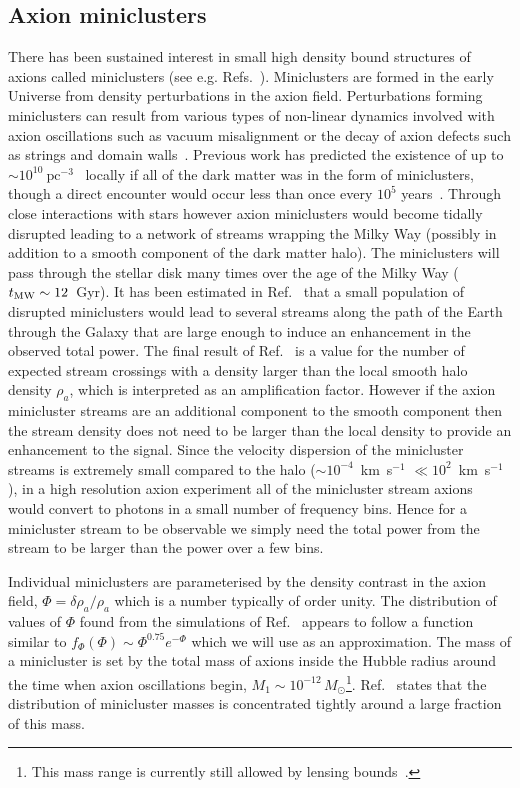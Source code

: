 \subsection{Axion miniclusters}\label{sec:axions_miniclusters}
There has been sustained interest in small high density bound structures of axions called miniclusters (see e.g. Refs.~\cite{Hogan:1988mp,Kolb:1993zz,Kolb:1993hw,Kolb:1994fi,Kolb:1995bu,Berezinsky:2013fxa,Tinyakov:2015cgg,Fairbairn:2017dmf}). Miniclusters are formed in the early Universe from density perturbations in the axion field. Perturbations forming miniclusters can result from various types of non-linear dynamics involved with axion oscillations such as vacuum misalignment or the decay of axion defects such as strings and domain walls~\cite{Chang:1998tb}. Previous work has predicted the existence of up to $\sim 10^{10}~\textrm{pc}^{-3}$~\cite{Tinyakov:2015cgg} locally if all of the dark matter was in the form of miniclusters, though a direct encounter would occur less than once every $10^5$ years~\cite{Kolb:1994fi}. Through close interactions with stars however axion miniclusters would become tidally disrupted leading to a network of streams wrapping the Milky Way (possibly in addition to a smooth component of the dark matter halo). The miniclusters will pass through the stellar disk many times over the age of the Milky Way ($t_{\rm MW} \sim 12$~Gyr). It has been estimated in Ref.~\cite{Tinyakov:2015cgg} that a small population of disrupted miniclusters would lead to several streams along the path of the Earth through the Galaxy that are large enough to induce an enhancement in the observed total power. The final result of Ref.~\cite{Tinyakov:2015cgg} is a value for the number of expected stream crossings with a density larger than the local smooth halo density $\rho_a$, which is interpreted as an amplification factor. However if the axion minicluster streams are an additional component to the smooth component then the stream density does not need to be larger than the local density to provide an enhancement to the signal. Since the velocity dispersion of the minicluster streams is extremely small compared to the halo ($\sim10^{-4}$~km~s$^{-1}$ $\ll 10^{2}$~km~s$^{-1}$), in a high resolution axion experiment all of the minicluster stream axions would convert to photons in a small number of frequency bins. Hence for a minicluster stream to be observable we simply need the total power from the stream to be larger than the power over a few bins.

Individual miniclusters are parameterised by the density contrast in the axion field, $\Phi = \delta \rho_a / \rho_a$ which is a number typically of order unity. The distribution of values of $\Phi$ found from the simulations of Ref.~\cite{Kolb:1995bu} appears to follow a function similar to $f_\Phi(\Phi) \sim \Phi^{0.75} e^{-\Phi}$ which we will use as an approximation. The mass of a minicluster is set by the total mass of axions inside the Hubble radius around the time when axion oscillations begin, $M_1 \sim 10^{-12}\, M_\odot$\footnote{This mass range is currently still allowed by lensing bounds~\cite{Zurek:2006sy}.}. Ref.~\cite{Kolb:1995bu} states that the distribution of minicluster masses is concentrated tightly around a large fraction of this mass.

